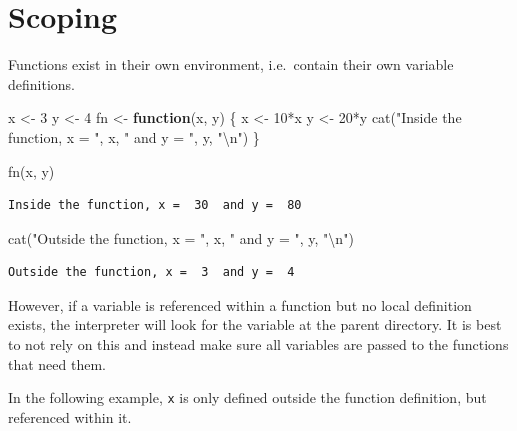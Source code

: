\documentclass[
]{book}
\newenvironment{Shaded}{\begin{snugshade}}{\end{snugshade}}
\newcommand{\ControlFlowTok}[1]{\textcolor[rgb]{0.13,0.29,0.53}{\textbf{#1}}}
\newcommand{\DecValTok}[1]{\textcolor[rgb]{0.00,0.00,0.81}{#1}}
\newcommand{\FunctionTok}[1]{\textcolor[rgb]{0.00,0.00,0.00}{#1}}
\newcommand{\NormalTok}[1]{#1}
\newcommand{\OtherTok}[1]{\textcolor[rgb]{0.56,0.35,0.01}{#1}}
\newcommand{\SpecialCharTok}[1]{\textcolor[rgb]{0.00,0.00,0.00}{#1}}
\newcommand{\StringTok}[1]{\textcolor[rgb]{0.31,0.60,0.02}{#1}}
\begin{document}
\hypertarget{scoping}{%
\section{Scoping}\label{scoping}}

Functions exist in their own environment, i.e.~contain their own variable definitions.

\begin{Shaded}
\begin{Highlighting}[]
\NormalTok{x }\OtherTok{\textless{}{-}} \DecValTok{3}
\NormalTok{y }\OtherTok{\textless{}{-}} \DecValTok{4}
\NormalTok{fn }\OtherTok{\textless{}{-}} \ControlFlowTok{function}\NormalTok{(x, y) \{}
\NormalTok{  x }\OtherTok{\textless{}{-}} \DecValTok{10}\SpecialCharTok{*}\NormalTok{x}
\NormalTok{  y }\OtherTok{\textless{}{-}} \DecValTok{20}\SpecialCharTok{*}\NormalTok{y}
  \FunctionTok{cat}\NormalTok{(}\StringTok{"Inside the function, x = "}\NormalTok{, x, }\StringTok{" and y = "}\NormalTok{, y, }\StringTok{"}\SpecialCharTok{\textbackslash{}n}\StringTok{"}\NormalTok{)}
\NormalTok{\}}

\FunctionTok{fn}\NormalTok{(x, y)}
\end{Highlighting}
\end{Shaded}

\begin{verbatim}
Inside the function, x =  30  and y =  80 
\end{verbatim}

\begin{Shaded}
\begin{Highlighting}[]
\FunctionTok{cat}\NormalTok{(}\StringTok{"Outside the function, x = "}\NormalTok{, x, }\StringTok{" and y = "}\NormalTok{, y, }\StringTok{"}\SpecialCharTok{\textbackslash{}n}\StringTok{"}\NormalTok{)}
\end{Highlighting}
\end{Shaded}

\begin{verbatim}
Outside the function, x =  3  and y =  4 
\end{verbatim}

However, if a variable is referenced within a function but no local definition exists, the interpreter will look for the variable at the parent directory. It is best to not rely on this and instead make sure all variables are passed to the functions that need them.

In the following example, \texttt{x} is only defined outside the function definition, but referenced within it.
\end{document}
